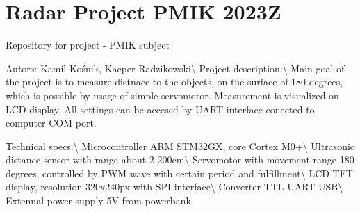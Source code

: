 \chapter{Radar Project PMIK 2023Z}
\label{md__r_e_a_d_m_e}
\label{md__r_e_a_d_m_e_autotoc_md15}%
Repository for project -\/ PMIK subject

Autors\+: Kamil Kośnik, Kacper Radzikowski\textbackslash{} Project description\+:\textbackslash{} Main goal of the project is to measure distnace to the objects, on the surface of 180 degrees, which is possible by usage of simple servomotor. Measurement is visualized on LCD display. All settings can be accesed by UART interface conected to computer COM port.

Technical specs\+:\textbackslash{} Microcontroller ARM STM32\+GX, core Cortex M0+\textbackslash{} Ultrasonic distance sensor with range about 2-\/200cm\textbackslash{} Servomotor with movement range 180 degrees, controlled by PWM wave with certain period and fulfillment\textbackslash{} LCD TFT display, resolution 320x240px with SPI interface\textbackslash{} Converter TTL UART-\/\+USB\textbackslash{} Extennal power supply 5V from powerbank 